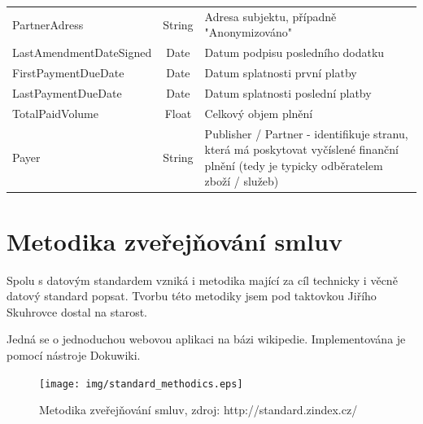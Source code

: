 \begin{center}
\begin{longtable}{lcp{65mm}}
PartnerAdress & String & Adresa subjektu, případně "Anonymizováno" \\
LastAmendmentDateSigned & Date & Datum podpisu posledního dodatku \\
FirstPaymentDueDate & Date & Datum splatnosti první platby \\
LastPaymentDueDate & Date & Datum splatnosti poslední platby \\
TotalPaidVolume & Float & Celkový objem plnění \\
\rowcolor{validateC}Payer & String & Publisher / Partner - identifikuje stranu, která má poskytovat vyčíslené finanční plnění (tedy je typicky odběratelem zboží / služeb) \\
\end{longtable}
\end{center}

\newpage

\section{Metodika zveřejňování smluv}

Spolu s datovým standardem vzniká i metodika mající za cíl technicky i věcně datový standard popsat. Tvorbu této metodiky jsem pod taktovkou Jiřího Skuhrovce dostal na starost.

Jedná se o jednoduchou webovou aplikaci na bázi wikipedie\cite{Wikipedia}. Implementována je pomocí nástroje Dokuwiki\cite{Dokuwiki}.\\

\begin{figure}[h]
\centerline{\texttt{[image: img/standard\_methodics.eps]}}
\caption{Metodika zveřejňování smluv, zdroj: http://standard.zindex.cz/}
\label{obr:standard_methodics}
\end{figure}

